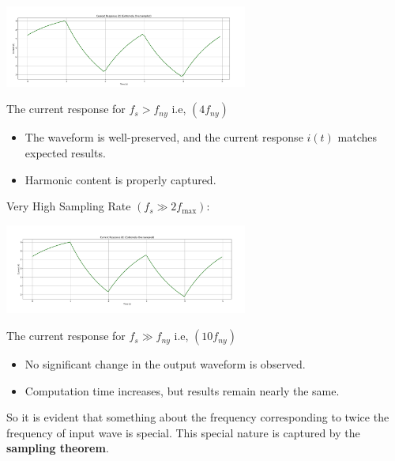       \captionsetup{type=figure}
    \centering
    \includegraphics[width=0.6\textwidth]{figs/4_f_ny.png}
    \caption{The current response for  $f_s > f_{ny}$   i.e, $(4f_{ny})$}
    \label{fig:example}
    \begin{itemize}
        \item The waveform is well-preserved, and the current response $i(t)$ matches expected results.
        \item Harmonic content is properly captured.
    \end{itemize}
    \begin{center} 
     Very High Sampling Rate $(f_s \gg 2 f_{\max}):$
    \end{center}
     \captionsetup{type=figure}
    \centering
    \includegraphics[width=0.6\textwidth]{figs/10_f_ny.png}
    \caption{The current response for  $f_s \gg f_{ny}$   i.e, $(10 f_{ny})$}
    \label{fig:example}
    \begin{itemize}
        \item 	No significant change in the output waveform is observed.
        \item Computation time increases, but results remain nearly the same.
    \end{itemize}
    So it is evident that something about the frequency corresponding to twice the frequency of input wave is special. This special nature is captured by the \textbf{sampling theorem}.

